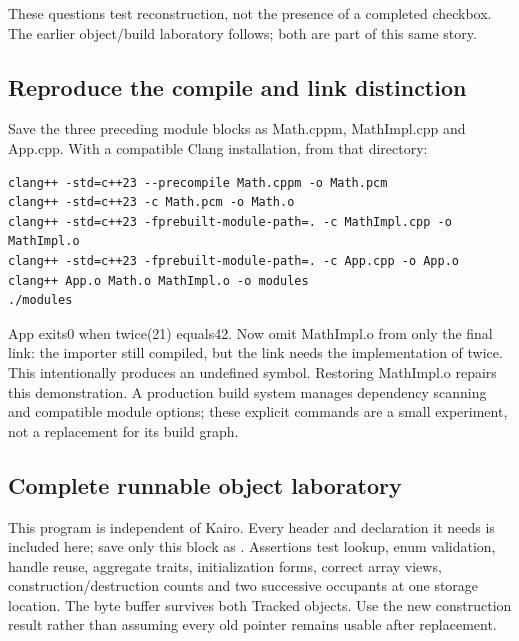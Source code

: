 These questions test reconstruction, not the presence of a completed checkbox. The earlier object/build laboratory follows; both are part of this same story.

\subsection{Reproduce the compile and link distinction}\label{05-engine-i-ch004-reproduce-the-compile-and-link-distinction}

\hypertarget{05-engine-i-ch004-reproduce-the-compile-and-link-distinction}{}

Save the three preceding module blocks as Math.cppm, MathImpl.cpp and App.cpp. With a compatible Clang installation, from that directory:

\begin{verbatim}
clang++ -std=c++23 --precompile Math.cppm -o Math.pcm
clang++ -std=c++23 -c Math.pcm -o Math.o
clang++ -std=c++23 -fprebuilt-module-path=. -c MathImpl.cpp -o MathImpl.o
clang++ -std=c++23 -fprebuilt-module-path=. -c App.cpp -o App.o
clang++ App.o Math.o MathImpl.o -o modules
./modules
\end{verbatim}

App exits0 when twice(21) equals42. Now omit MathImpl.o from only the final link: the importer still compiled, but the link needs the implementation of twice. This intentionally produces an undefined symbol. Restoring MathImpl.o repairs this demonstration. A production build system manages dependency scanning and compatible module options; these explicit commands are a small experiment, not a replacement for its build graph.

\subsection{Complete runnable object laboratory}\label{05-engine-i-ch004-complete-runnable-object-laboratory}

\hypertarget{05-engine-i-ch004-complete-runnable-object-laboratory}{}

This program is independent of Kairo. Every header and declaration it needs is included here; save only this block as . Assertions test lookup, enum validation, handle reuse, aggregate traits, initialization forms, correct array views, construction/destruction counts and two successive occupants at one storage location. The byte buffer survives both Tracked objects. Use the new construction result rather than assuming every old pointer remains usable after replacement.

